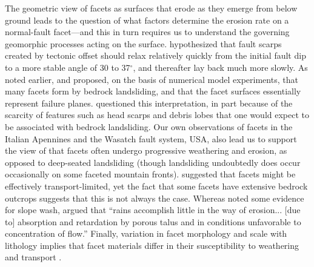 The geometric view of facets as surfaces that erode as they emerge from below ground leads to the question of what factors determine the erosion rate on a normal-fault facet---and this in turn requires us to understand the governing geomorphic processes acting on the surface. \citet{wallace1978geometry} hypothesized that fault scarps created by tectonic offset should relax relatively quickly from the initial fault dip to a more stable angle of 30 to 37$^\circ$, and thereafter lay back much more slowly. As noted earlier, \citet{densmore1998landsliding} and \citet{ellis1999development} proposed, on the basis of numerical model experiments, that many facets form by bedrock landsliding, and that the facet surfaces essentially represent failure planes. \citet{petit2009faceted} questioned this interpretation, in part because of the scarcity of features such as head scarps and debris lobes that one would expect to be associated with bedrock landsliding. Our own observations of facets in the Italian Apennines and the Wasatch fault system, USA, also lead us to support the view of \citet{petit2009faceted} that facets often undergo progressive weathering and erosion, as opposed to deep-seated landsliding (though landsliding undoubtedly does occur occasionally on some faceted mountain fronts). \citet{menges1990soils} suggested that facets might be effectively transport-limited, yet the fact that some facets have extensive bedrock outcrops suggests that this is not always the case. Whereas \citet{menges1990soils} noted some evidence for slope wash, \citet{gilbert1928studies} argued that ``rains accomplish little in the way of erosion... [due to] absorption and retardation by porous talus and in conditions unfavorable to concentration of flow.'' Finally, variation in facet morphology and scale with lithology implies that facet materials differ in their susceptibility to weathering and transport \citep{menges1990soils,zuchiewicz2000geometry}. 

